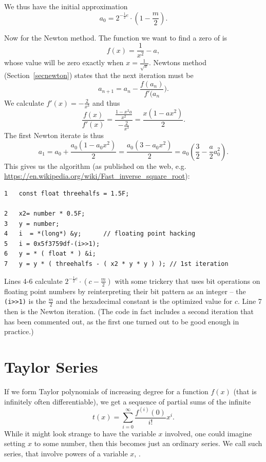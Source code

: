 We thus have the initial approximation 
\[
a_0=2^{-\frac12e}\cdot\left(1-\frac{m}2\right).
\]

Now for the Newton method. The function we want to find a zero of is 
\[
f(x)=\frac{1}{x^2}-a,
\]
whose value will be zero exactly when
$x=\frac1{\sqrt{x}}$. Newtons method (Section~\ref{secnewton}) states that
the next iteration must be
\[
a_{n+1}=a_n-\frac{f(a_n)}{f'(a_n}).
\]
We calculate $f'(x)=-\frac{2}{x^3}$ and thus
\[
\frac{f(x)}{f'(x)}=\frac{\frac{1-x^2a}{x^2}}{-\frac{2}{x^3}}
=\frac{x(1-ax^2)}{2}.
\]
The first Newton iterate is thus
\[
a_1=a_0+\frac{a_0(1-a_0x^2)}{2}
=\frac{a_0(3-a_0x^2)}{2}=a_0\left(\frac{3}{2}-\frac{a}{2}a_0^2\right).
\]
This gives us the algorithm (as published on the web, e.g.
\url{https://en.wikipedia.org/wiki/Fast_inverse_square_root}):
\begin{verbatim}
1   const float threehalfs = 1.5F;

2   x2= number * 0.5F;
3   y = number;
4   i  = *(long*) &y;      // floating point hacking
5   i = 0x5f3759df-(i>>1); 
6   y = * ( float * ) &i;
7   y = y * ( threehalfs - ( x2 * y * y ) ); // 1st iteration
\end{verbatim}
Lines 4-6 calculate $2^{-\frac12e}\cdot\left(c-\frac{m}2\right)$ with some
trickery that uses bit operations on floating point numbers by reinterpreting
their bit pattern as an integer -- the
\texttt{(i>>1)} is the $\frac{m}{2}$ and the hexadecimal constant is the
optimized value for $c$.
Line 7 then is the Newton iteration. (The code in fact includes a second
iteration that has been commented out, as the first one turned out to be good
enough in practice.)

\section{Taylor Series}
\label{sectaylors}

If we form Taylor polynomials of increasing degree for a function $f(x)$
(that is infinitely often differentiable),
we get a sequence of partial sums of the infinite
\[
t(x)=\sum_{i=0}^\infty\frac{f^{(i)}(0)}{i!} x^i.
\]
While it might look strange to have the variable $x$ involved, one could
imagine setting $x$ to some number, then this becomes just an ordinary
series. We call such series, that involve powers of a variable $x$,
.

